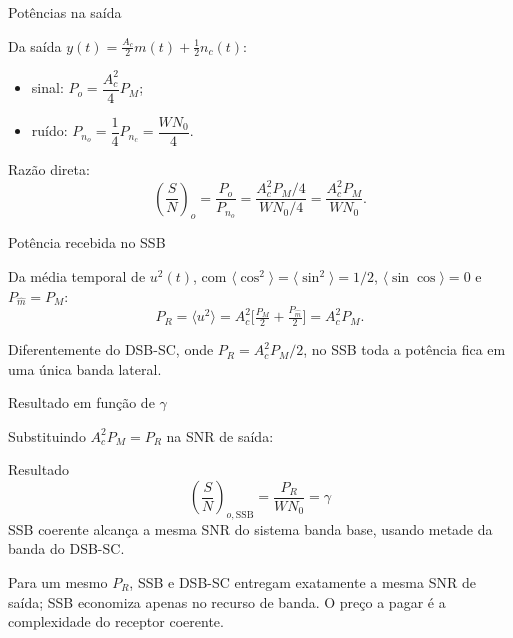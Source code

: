 
\begin{frame}{Potências na saída}

Da saída $y(t) = \tfrac{A_c}{2} m(t) + \tfrac{1}{2} n_c(t)$:
\begin{itemize}
\item sinal: $P_o = \dfrac{A_c^2}{4} P_M$;
\item ruído: $P_{n_o} = \dfrac{1}{4} P_{n_c} = \dfrac{W N_0}{4}$.
\end{itemize}

\vspace{0.2cm}

Razão direta:
\[
\left(\frac{S}{N}\right)_o = \frac{P_o}{P_{n_o}} = \frac{A_c^2 P_M / 4}{W N_0 / 4} = \frac{A_c^2 P_M}{W N_0}.
\]

\end{frame}


\begin{frame}{Potência recebida no SSB}

Da média temporal de $u^2(t)$, com $\langle\cos^2\rangle = \langle\sin^2\rangle = 1/2$, $\langle\sin\cos\rangle = 0$ e $P_{\hat m} = P_M$:
\[
P_R = \langle u^2\rangle = A_c^2\bigl[\tfrac{P_M}{2} + \tfrac{P_{\hat m}}{2}\bigr] = A_c^2 P_M.
\]

\vspace{0.2cm}

Diferentemente do DSB-SC, onde $P_R = A_c^2 P_M/2$, no SSB toda a potência fica em uma única banda lateral.

\end{frame}


\begin{frame}{Resultado em função de $\gamma$}

Substituindo $A_c^2 P_M = P_R$ na SNR de saída:

\begin{block}{Resultado}
\[
\left(\frac{S}{N}\right)_{o,\text{SSB}} = \frac{P_R}{W N_0} = \gamma
\]
SSB coerente alcança a mesma SNR do sistema banda base, usando metade da banda do DSB-SC.
\end{block}

\vspace{0.2cm}

Para um mesmo $P_R$, SSB e DSB-SC entregam exatamente a mesma SNR de saída; SSB economiza apenas no recurso de banda. O preço a pagar é a complexidade do receptor coerente.

\end{frame}

